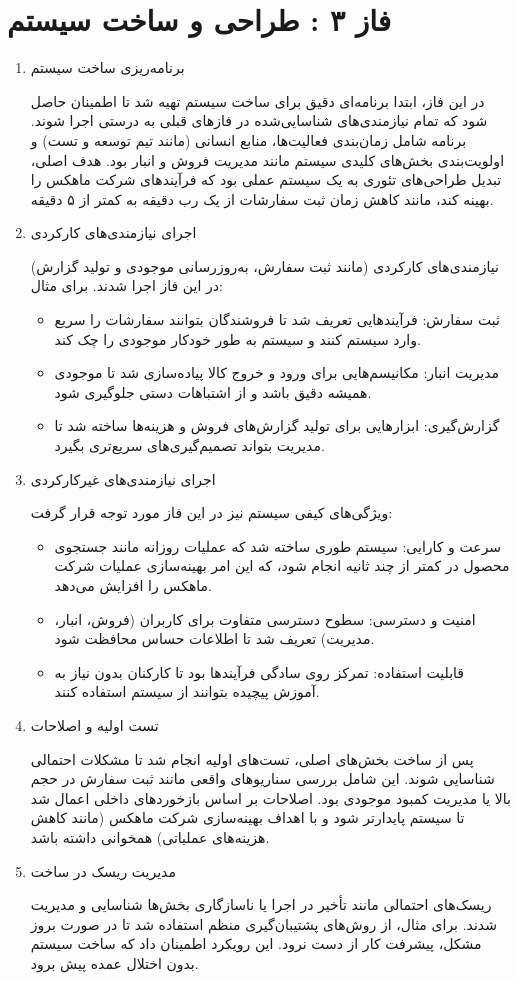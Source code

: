 \documentclass[12pt,a4paper]{report}
\begin{document}
\section{فاز ۳ : طراحی و ساخت سیستم}
\begin{enumerate}
	\item 
برنامه‌ریزی ساخت سیستم

در این فاز، ابتدا برنامه‌ای دقیق برای ساخت سیستم تهیه شد تا اطمینان حاصل شود که تمام نیازمندی‌های شناسایی‌شده در فازهای قبلی به درستی اجرا شوند. برنامه شامل زمان‌بندی فعالیت‌ها، منابع انسانی (مانند تیم توسعه و تست) و اولویت‌بندی بخش‌های کلیدی سیستم مانند مدیریت فروش و انبار بود. هدف اصلی، تبدیل طراحی‌های تئوری به یک سیستم عملی بود که فرآیندهای شرکت ماهکس را بهینه کند، مانند کاهش زمان ثبت سفارشات از یک رب دقیقه به کمتر از ۵ دقیقه.


	\item اجرای نیازمندی‌های کارکردی
	
نیازمندی‌های کارکردی (مانند ثبت سفارش، به‌روزرسانی موجودی و تولید گزارش) در این فاز اجرا شدند. برای مثال:
	\begin{itemize}
		\item 
ثبت سفارش: فرآیندهایی تعریف شد تا فروشندگان بتوانند سفارشات را سریع وارد سیستم کنند و سیستم به طور خودکار موجودی را چک کند.
		\item 
مدیریت انبار: مکانیسم‌هایی برای ورود و خروج کالا پیاده‌سازی شد تا موجودی همیشه دقیق باشد و از اشتباهات دستی جلوگیری شود.
		\item 
گزارش‌گیری: ابزارهایی برای تولید گزارش‌های فروش و هزینه‌ها ساخته شد تا مدیریت بتواند تصمیم‌گیری‌های سریع‌تری بگیرد.
	\end{itemize}
	\item 
	اجرای نیازمندی‌های غیرکارکردی
	
	ویژگی‌های کیفی سیستم نیز در این فاز مورد توجه قرار گرفت:
	\begin{itemize}
		\item 
سرعت و کارایی: سیستم طوری ساخته شد که عملیات روزانه مانند جستجوی محصول در کمتر از چند ثانیه انجام شود، که این امر بهینه‌سازی عملیات شرکت ماهکس را افزایش می‌دهد.
		\item 
امنیت و دسترسی: سطوح دسترسی متفاوت برای کاربران (فروش، انبار، مدیریت) تعریف شد تا اطلاعات حساس محافظت شود.
		\item 
قابلیت استفاده: تمرکز روی سادگی فرآیندها بود تا کارکنان بدون نیاز به آموزش پیچیده بتوانند از سیستم استفاده کنند.
	\end{itemize}
	\item 
تست اولیه و اصلاحات

پس از ساخت بخش‌های اصلی، تست‌های اولیه انجام شد تا مشکلات احتمالی شناسایی شوند. این شامل بررسی سناریوهای واقعی مانند ثبت سفارش در حجم بالا یا مدیریت کمبود موجودی بود. اصلاحات بر اساس بازخوردهای داخلی اعمال شد تا سیستم پایدارتر شود و با اهداف بهینه‌سازی شرکت ماهکس (مانند کاهش هزینه‌های عملیاتی) همخوانی داشته باشد.

\item 
مدیریت ریسک در ساخت

ریسک‌های احتمالی مانند تأخیر در اجرا یا ناسازگاری بخش‌ها شناسایی و مدیریت شدند. برای مثال، از روش‌های پشتیبان‌گیری منظم استفاده شد تا در صورت بروز مشکل، پیشرفت کار از دست نرود. این رویکرد اطمینان داد که ساخت سیستم بدون اختلال عمده پیش برود.
\end{enumerate}
\end{document}
